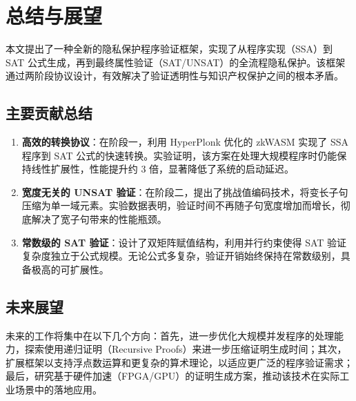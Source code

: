\chapter{总结与展望}
\label{chapter:conclusion}

本文提出了一种全新的隐私保护程序验证框架，实现了从程序实现（SSA）到 SAT 公式生成，再到最终属性验证（SAT/UNSAT）的全流程隐私保护。该框架通过两阶段协议设计，有效解决了验证透明性与知识产权保护之间的根本矛盾。

\section{主要贡献总结}
\begin{enumerate}
    \item \textbf{高效的转换协议}：在阶段一，利用 HyperPlonk 优化的 zkWASM 实现了 SSA 程序到 SAT 公式的快速转换。实验证明，该方案在处理大规模程序时仍能保持线性扩展性，性能提升约 3 倍，显著降低了系统的启动延迟。
    \item \textbf{宽度无关的 UNSAT 验证}：在阶段二，提出了挑战值编码技术，将变长子句压缩为单一域元素。实验数据表明，验证时间不再随子句宽度增加而增长，彻底解决了宽子句带来的性能瓶颈。
    \item \textbf{常数级的 SAT 验证}：设计了双矩阵赋值结构，利用并行约束使得 SAT 验证复杂度独立于公式规模。无论公式多复杂，验证开销始终保持在常数级别，具备极高的可扩展性。
\end{enumerate}

\section{未来展望}
未来的工作将集中在以下几个方向：首先，进一步优化大规模并发程序的处理能力，探索使用递归证明（Recursive Proofs）来进一步压缩证明生成时间；其次，扩展框架以支持浮点数运算和更复杂的算术理论，以适应更广泛的程序验证需求；最后，研究基于硬件加速（FPGA/GPU）的证明生成方案，推动该技术在实际工业场景中的落地应用。